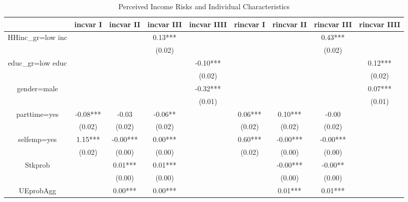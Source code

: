 \documentclass[12pt,notitlepage,onecolumn,aps,pra]{article}
\begin{document}
\begin{table}[p]
\centering
\begin{adjustbox}{width=\textwidth}
\begin{threeparttable}
\caption{Perceived Income Risks and Individual Characteristics}
\label{micro_reg}\begin{tabular}{ccccccccc}
\toprule
{} &  incvar I & incvar II & incvar III & incvar IIII & rincvar I & rincvar II & rincvar III & rincvar IIII \\
\midrule
HHinc\_gr=low inc &           &           &    0.13*** &             &           &            &     0.43*** &              \\
                 &           &           &     (0.02) &             &           &            &      (0.02) &              \\
educ\_gr=low educ &           &           &            &    -0.10*** &           &            &             &      0.12*** \\
                 &           &           &            &      (0.02) &           &            &             &       (0.02) \\
gender=male      &           &           &            &    -0.32*** &           &            &             &      0.07*** \\
                 &           &           &            &      (0.01) &           &            &             &       (0.01) \\
parttime=yes     &  -0.08*** &     -0.03 &    -0.06** &             &   0.06*** &    0.10*** &       -0.00 &              \\
                 &    (0.02) &    (0.02) &     (0.02) &             &    (0.02) &     (0.02) &      (0.02) &              \\
selfemp=yes      &   1.15*** &  -0.00*** &    0.00*** &             &   0.60*** &   -0.00*** &    -0.00*** &              \\
                 &    (0.02) &    (0.00) &     (0.00) &             &    (0.02) &     (0.00) &      (0.00) &              \\
Stkprob          &           &   0.01*** &    0.01*** &             &           &   -0.00*** &     -0.00** &              \\
                 &           &    (0.00) &     (0.00) &             &           &     (0.00) &      (0.00) &              \\
UEprobAgg        &           &   0.00*** &    0.00*** &             &           &    0.01*** &     0.01*** &              \\

\end{tabular}
\end{threeparttable}
\end{adjustbox}
\end{table}
\end{document}
